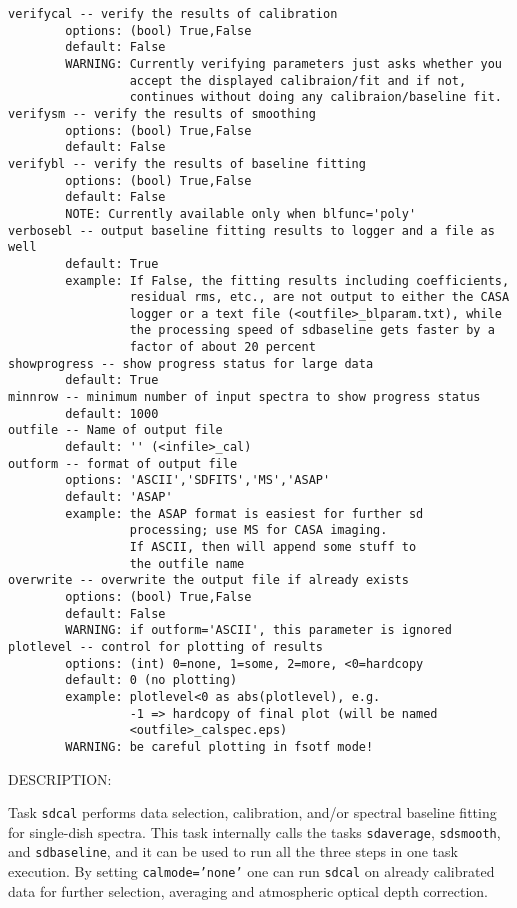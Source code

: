 \begin{verbatim}
verifycal -- verify the results of calibration
        options: (bool) True,False
        default: False
        WARNING: Currently verifying parameters just asks whether you 
                 accept the displayed calibraion/fit and if not, 
                 continues without doing any calibraion/baseline fit.
verifysm -- verify the results of smoothing
        options: (bool) True,False
        default: False
verifybl -- verify the results of baseline fitting
        options: (bool) True,False
        default: False
        NOTE: Currently available only when blfunc='poly'
verbosebl -- output baseline fitting results to logger and a file as well
        default: True
        example: If False, the fitting results including coefficients, 
                 residual rms, etc., are not output to either the CASA 
                 logger or a text file (<outfile>_blparam.txt), while 
                 the processing speed of sdbaseline gets faster by a 
                 factor of about 20 percent
showprogress -- show progress status for large data
        default: True
minnrow -- minimum number of input spectra to show progress status
        default: 1000
outfile -- Name of output file
        default: '' (<infile>_cal)
outform -- format of output file
        options: 'ASCII','SDFITS','MS','ASAP'
        default: 'ASAP'
        example: the ASAP format is easiest for further sd
                 processing; use MS for CASA imaging.
                 If ASCII, then will append some stuff to
                 the outfile name
overwrite -- overwrite the output file if already exists
        options: (bool) True,False
        default: False
        WARNING: if outform='ASCII', this parameter is ignored
plotlevel -- control for plotting of results
        options: (int) 0=none, 1=some, 2=more, <0=hardcopy
        default: 0 (no plotting)
        example: plotlevel<0 as abs(plotlevel), e.g.
                 -1 => hardcopy of final plot (will be named
                 <outfile>_calspec.eps)
        WARNING: be careful plotting in fsotf mode!

\end{verbatim}
    
DESCRIPTION:

Task {\tt sdcal} performs data selection, calibration, and/or spectral
baseline fitting for single-dish spectra. This task internally calls the
tasks {\tt sdaverage}, {\tt sdsmooth}, and {\tt sdbaseline}, and it can be used to run all the
three steps in one task execution.
By setting {\tt calmode='none'}
one can run {\tt sdcal} on already calibrated data for further selection, averaging and atmospheric optical depth correction.

